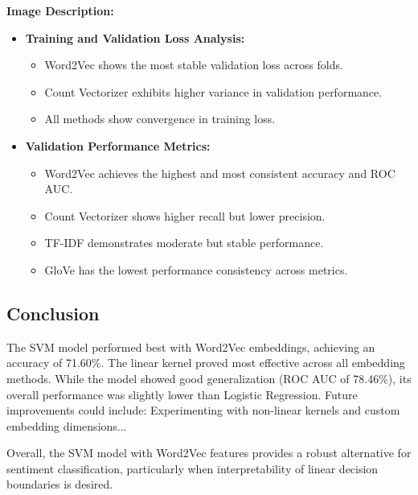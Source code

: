\textbf{Image Description:}

\begin{itemize}
    \item \textbf{Training and Validation Loss Analysis:}
    \begin{itemize}
        \item Word2Vec shows the most stable validation loss across folds.
        \item Count Vectorizer exhibits higher variance in validation performance.
        \item All methods show convergence in training loss.
    \end{itemize}
    
    \item \textbf{Validation Performance Metrics:}
    \begin{itemize}
        \item Word2Vec achieves the highest and most consistent accuracy and ROC AUC.
        \item Count Vectorizer shows higher recall but lower precision.
        \item TF-IDF demonstrates moderate but stable performance.
        \item GloVe has the lowest performance consistency across metrics.
    \end{itemize}
\end{itemize}

\subsection{Conclusion}

The SVM model performed best with Word2Vec embeddings, achieving an accuracy of 71.60\%. The linear kernel proved most effective across all embedding methods. While the model showed good generalization (ROC AUC of 78.46\%), its overall performance was slightly lower than Logistic Regression. Future improvements could include: Experimenting with non-linear kernels and custom embedding dimensions...

Overall, the SVM model with Word2Vec features provides a robust alternative for sentiment classification, particularly when interpretability of linear decision boundaries is desired.